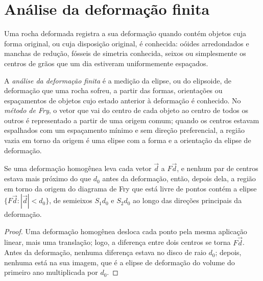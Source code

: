 \section{Análise da deformação finita}\label{sec:b3:structural-analysis:strain}

Uma rocha deformada registra a sua deformação quando contém objetos cuja forma original,
ou cuja disposição original, é conhecida: oóides arredondados e manchas de redução,
fósseis de simetria conhecida, seixos ou simplesmente os centros de grãos
que um dia estiveram uniformemente espaçados.

\begin{definition}\label{def:b3:structural-analysis:strain-analysis}
A \emph{análise da deformação finita} é a medição
da elipse, ou do elipsoide, de deformação que uma rocha sofreu, a partir das
formas, orientações ou espaçamentos de objetos cujo estado anterior à
deformação é conhecido. No \emph{método de Fry}, o vetor
que vai do centro de cada objeto ao centro de todos os outros é representado a
partir de uma origem comum; quando os centros estavam espalhados com um espaçamento
mínimo e sem direção preferencial, a região vazia em torno da origem é uma elipse
com a forma e a orientação da elipse de deformação.
\end{definition}

\begin{proposition}\label{prop:b3:structural-analysis:fry}
Se uma deformação homogênea leva cada vetor $\vec d$ a $F\vec d$, e nenhum par de
centros estava mais próximo do que $d_0$ antes da deformação, então, depois dela, a
região em torno da origem do diagrama de Fry que está livre de pontos contém a elipse
$\{F\vec d : |\vec d| < d_0\}$, de semieixos $S_1d_0$ e $S_2d_0$ ao longo das
direções principais da deformação.
\end{proposition}

\begin{proof}
Uma deformação homogênea desloca cada ponto pela mesma aplicação linear, mais uma
translação; logo, a diferença entre dois centros se torna $F\vec d$. Antes da
deformação, nenhuma diferença estava no disco de raio $d_0$; depois, nenhuma está
na sua imagem, que é a elipse de deformação do volume do primeiro ano multiplicada por $d_0$.
\end{proof}

